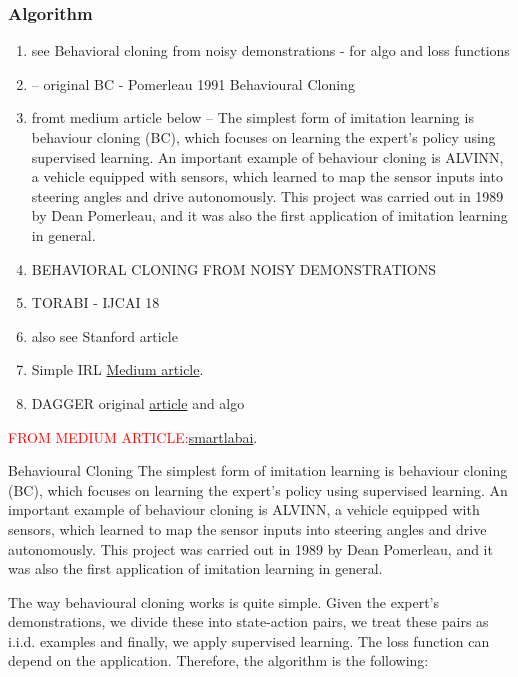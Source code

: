 \documentclass{article}
\begin{document}
\subsubsection{Algorithm}
\begin{enumerate}
	\item see \citep{sasaki2020} Behavioral cloning from noisy demonstrations - for algo and loss functions
	
	\item  \cite{Pomerleau1991} -- original BC - Pomerleau 1991 Behavioural Cloning
	\item fromt medium article below -- The simplest form of imitation learning is behaviour cloning (BC), which focuses on learning the expert’s policy using supervised learning. An important example of behaviour cloning is ALVINN, a vehicle equipped with sensors, which learned to map the sensor inputs into steering angles and drive autonomously. This project was carried out in 1989 by Dean Pomerleau, and it was also the first application of imitation learning in general.
	
	\item BEHAVIORAL CLONING FROM NOISY DEMONSTRATIONS
	
	\item TORABI - IJCAI 18
	\item also see Stanford article
	\item Simple IRL \href{https://smartlabai.medium.com/a-brief-overview-of-imitation-learning-8a8a75c44a9c}{Medium article}.
	\item DAGGER original \href{https://www.ri.cmu.edu/pub_files/2011/4/Ross-AISTATS11-NoRegret.pdf}{article} and algo
\end{enumerate}

\textcolor{red}{FROM MEDIUM ARTICLE:}\href{https://smartlabai.medium.com/a-brief-overview-of-imitation-learning-8a8a75c44a9c}{smartlabai}.

Behavioural Cloning
The simplest form of imitation learning is behaviour cloning (BC), which focuses on learning the expert’s policy using supervised learning. An important example of behaviour cloning is ALVINN, a vehicle equipped with sensors, which learned to map the sensor inputs into steering angles and drive autonomously. This project was carried out in 1989 by Dean Pomerleau, and it was also the first application of imitation learning in general.

The way behavioural cloning works is quite simple. Given the expert’s demonstrations, we divide these into state-action pairs, we treat these pairs as i.i.d. examples and finally, we apply supervised learning. The loss function can depend on the application. Therefore, the algorithm is the following:
\end{document}
